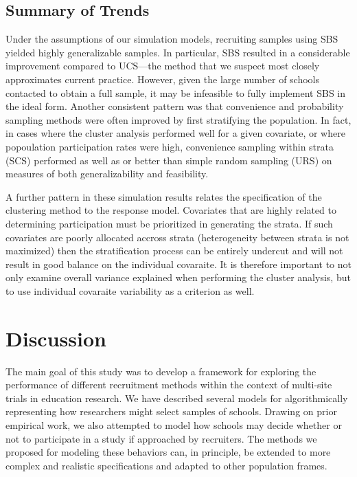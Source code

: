 \documentclass[english,man,floatsintext]{apa6}
\begin{document}
\hypertarget{summary-of-trends}{%
\subsection{Summary of Trends}\label{summary-of-trends}}

Under the assumptions of our simulation models, recruiting samples using SBS yielded highly generalizable samples. In particular, SBS resulted in a considerable improvement compared to UCS---the method that we suspect most closely approximates current practice. However, given the large number of schools contacted to obtain a full sample, it may be infeasible to fully implement SBS in the ideal form. Another consistent pattern was that convenience and probability sampling methods were often improved by first stratifying the population. In fact, in cases where the cluster analysis performed well for a given covariate, or where popoulation participation rates were high, convenience sampling within strata (SCS) performed as well as or better than simple random sampling (URS) on measures of both generalizability and feasibility.

A further pattern in these simulation results relates the specification of the clustering method to the response model. Covariates that are highly related to determining participation must be prioritized in generating the strata. If such covariates are poorly allocated accross strata (heterogeneity between strata is not maximized) then the stratification process can be entirely undercut and will not result in good balance on the individual covaraite. It is therefore important to not only examine overall variance explained when performing the cluster analysis, but to use individual covaraite variability as a criterion as well.  

\hypertarget{discussion}{%
\section{Discussion}\label{discussion}}

The main goal of this study was to develop a framework for exploring the performance of different recruitment methods within the context of multi-site trials in education research. We have described several models for algorithmically representing how researchers might select samples of schools. Drawing on prior empirical work, we also attempted to model how schools may decide whether or not to participate in a study if approached by recruiters. The methods we proposed for modeling these behaviors can, in principle, be extended to more complex and realistic specifications and adapted to other population frames.
\end{document}
